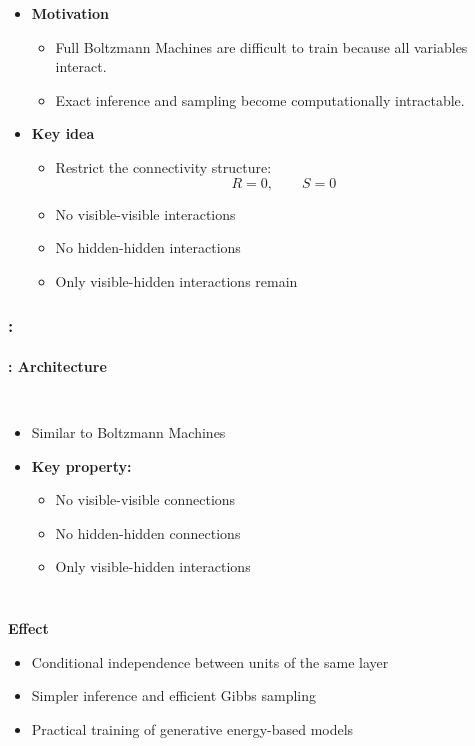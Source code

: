 \documentclass[xcolor=table]{beamer}
\begin{document}
	\begin{subsectionframe}
		\begin{itemize}
			
			\item \textbf{Motivation}
			\begin{itemize}
				\item Full Boltzmann Machines are difficult to train because all variables interact.
				\item Exact inference and sampling become computationally intractable.
			\end{itemize}
			
			\vspace{0.5em}
			
			\item \textbf{Key idea}
			\begin{itemize}
				\item Restrict the connectivity structure:
				\[
				R = 0, \qquad S = 0
				\]
				\item No visible-visible interactions
				\item No hidden-hidden interactions
				\item Only visible-hidden interactions remain
			\end{itemize}
			
		\end{itemize}
	\end{subsectionframe}
	
	\begin{frame}
		\frametitle{\insertshortsubtitle: \insertsection}
		\framesubtitle{\insertsubsection: Architecture}
		
		\begin{columns}
			
			\begin{itemize}
				\item Similar to Boltzmann Machines
				
				\item \textbf{Key property:}
				\begin{itemize}
					\item No visible-visible connections
					\item No hidden-hidden connections
					\item Only visible-hidden interactions
				\end{itemize}
			\end{itemize}
			
		\end{columns}
		
		\textbf{Effect}
		
		\begin{itemize}
			\item Conditional independence between units of the same layer
			\item Simpler inference and efficient Gibbs sampling
			\item Practical training of generative energy-based models
		\end{itemize}
		
	\end{frame}
	
\end{document}
